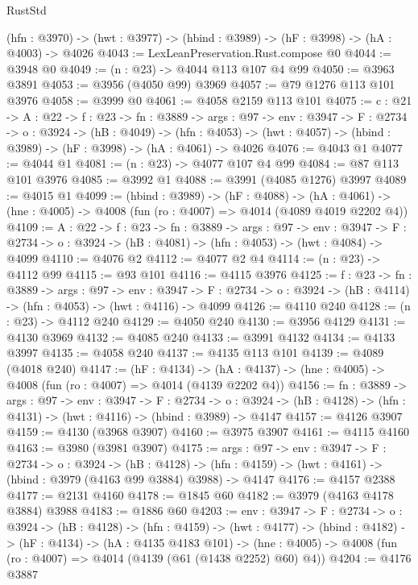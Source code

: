 \begin{lexlean}{RustStd}
\begin{coremodule}
  (hfn : @3970) -> (hwt : @3977) -> (hbind : @3989) -> (hF : @3998) -> (hA : @4003) -> @4026
@4043 := LexLeanPreservation.Rust.compose @0
@4044 := @3948 @0
@4049 := (n : @23) -> @4044 @113 @107 @4 @99
@4050 := @3963 @3891
@4053 := @3956 (@4050 @99) @3969
@4057 := @79 @1276 @113 @101 @3976
@4058 := @3999 @0
@4061 := @4058 @2159 @113 @101
@4075 := {c : @21} ->
  {A : @22} ->
  {f : @23} ->
  {fn : @3889} ->
  {args : @97} ->
  {env : @3947} ->
  {F : @2734} ->
  {o : @3924} ->
  (hB : @4049) ->
  (hfn : @4053) -> (hwt : @4057) -> (hbind : @3989) -> (hF : @3998) -> (hA : @4061) -> @4026
@4076 := @4043 @1
@4077 := @4044 @1
@4081 := (n : @23) -> @4077 @107 @4 @99
@4084 := @87 @113 @101 @3976
@4085 := @3992 @1
@4088 := @3991 (@4085 @1276) @3997
@4089 := @4015 @1
@4099 := (hbind : @3989) ->
  (hF : @4088) ->
  (hA : @4061) -> (hne : @4005) -> @4008 (fun (ro : @4007) => @4014 (@4089 @4019 @2202 @4))
@4109 := {A : @22} ->
  {f : @23} ->
  {fn : @3889} ->
  {args : @97} ->
  {env : @3947} ->
  {F : @2734} -> {o : @3924} -> (hB : @4081) -> (hfn : @4053) -> (hwt : @4084) -> @4099
@4110 := @4076 @2
@4112 := @4077 @2 @4
@4114 := (n : @23) -> @4112 @99
@4115 := @93 @101
@4116 := @4115 @3976
@4125 := {f : @23} ->
  {fn : @3889} ->
  {args : @97} ->
  {env : @3947} ->
  {F : @2734} -> {o : @3924} -> (hB : @4114) -> (hfn : @4053) -> (hwt : @4116) -> @4099
@4126 := @4110 @240
@4128 := (n : @23) -> @4112 @240
@4129 := @4050 @240
@4130 := @3956 @4129
@4131 := @4130 @3969
@4132 := @4085 @240
@4133 := @3991 @4132
@4134 := @4133 @3997
@4135 := @4058 @240
@4137 := @4135 @113 @101
@4139 := @4089 (@4018 @240)
@4147 := (hF : @4134) ->
  (hA : @4137) -> (hne : @4005) -> @4008 (fun (ro : @4007) => @4014 (@4139 @2202 @4))
@4156 := {fn : @3889} ->
  {args : @97} ->
  {env : @3947} ->
  {F : @2734} ->
  {o : @3924} -> (hB : @4128) -> (hfn : @4131) -> (hwt : @4116) -> (hbind : @3989) -> @4147
@4157 := @4126 @3907
@4159 := @4130 (@3968 @3907)
@4160 := @3975 @3907
@4161 := @4115 @4160
@4163 := @3980 (@3981 @3907)
@4175 := {args : @97} ->
  {env : @3947} ->
  {F : @2734} ->
  {o : @3924} ->
  (hB : @4128) -> (hfn : @4159) -> (hwt : @4161) -> (hbind : @3979 (@4163 @99 @3884) @3988) -> @4147
@4176 := @4157 @2388
@4177 := @2131 @4160
@4178 := @1845 @60
@4182 := @3979 (@4163 @4178 @3884) @3988
@4183 := @1886 @60
@4203 := {env : @3947} ->
  {F : @2734} ->
  {o : @3924} ->
  (hB : @4128) ->
  (hfn : @4159) ->
  (hwt : @4177) ->
  (hbind : @4182) ->
  (hF : @4134) ->
  (hA : @4135 @4183 @101) ->
  (hne : @4005) -> @4008 (fun (ro : @4007) => @4014 (@4139 (@61 (@1438 @2252) @60) @4))
@4204 := @4176 @3887

\end{coremodule}
\end{lexlean}
